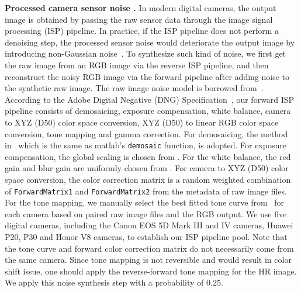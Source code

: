 \documentclass[10pt,twocolumn,letterpaper]{article}
\begin{document}
\begin{spacing}{1.5}
\end{spacing}
\noindent
\textbf{Processed camera sensor noise .}
In modern digital cameras, the output image is obtained by passing the raw sensor data through the image signal processing (ISP) pipeline. In practice, if the ISP pipeline does not perform a denoising step, the processed sensor noise would deteriorate the output image by introducing non-Gaussian noise~\cite{plotz2017benchmarking}. To synthesize such kind of noise, we first get the raw image from an RGB image via the reverse ISP pipeline, and then reconstruct the noisy RGB image via the forward pipeline after adding noise to the synthetic raw image. The raw image noise model is borrowed from~\cite{brooks2019unprocessing}. According to the Adobe Digital Negative (DNG) Specification~\cite{adobe2019}, our forward ISP pipeline consists of demosaicing, exposure compensation, white balance, camera to XYZ (D50) color space conversion, XYZ (D50) to linear RGB color space conversion, tone mapping and gamma correction. For demosaicing,
the method in~\cite{malvar2004high} which is the same as matlab's \texttt{demosaic} function, is adopted. For exposure compensation, the global scaling is chosen from . For the white balance, the red gain and blur gain are uniformly chosen from . For camera to XYZ (D50) color space conversion, the  color correction matrix is a random weighted combination of \texttt{ForwardMatrix1} and \texttt{ForwardMatrix2} from the metadata of raw image files.
For the tone mapping, we manually select the best fitted tone curve from~\cite{grossberg2003space} for each camera based on paired raw image files and the RGB output. We use five digital cameras, including the Canon EOS 5D Mark III and IV cameras, Huawei P20, P30 and Honor V8 cameras, to establish our ISP pipeline pool. Note that the tone curve and forward color correction matrix do not necessarily come from the same camera. Since tone mapping is not reversible and would result in color shift issue, one should apply the reverse-forward tone mapping for the HR image.
We apply this noise synthesis step with a probability of 0.25.
\end{document}
